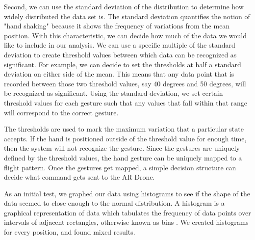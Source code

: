 \documentclass[letterpaper,english, 12pt]{article}
\begin{document}
Second, we can use the standard deviation of the distribution to determine how widely distributed the data set is. The standard deviation quantifies the notion of "hand shaking" because it shows the frequency of variations from the mean position. With this characteristic, we can decide how much of the data we would like to include in our analysis. We can use a specific multiple of the standard deviation to create threshold values between which data can be recognized as significant. For example, we can decide to set the thresholds at half a standard deviation on either side of the mean. This means that any data point that is recorded between those two threshold values, say 40 degrees and 50 degrees, will be recognized as significant. Using the standard deviation, we set certain threshold values for each gesture such that any values that fall within that range will correspond to the correct gesture.

 The thresholds are used to mark the maximum variation that a particular state accepts. If the hand is positioned outside of the threshold value for enough time, then the system will not recognize the gesture. Since the gestures are uniquely defined by the threshold values, the hand gesture can be uniquely mapped to a flight pattern. Once the gestures get mapped, a simple decision structure can decide what command gets sent to the AR Drone.

As an initial test, we graphed our data using histograms to see if the shape of the data seemed to close enough to the normal distribution. A histogram is a graphical representation of data which tabulates the frequency of data points over intervals of adjacent rectangles, otherwise known as bins \cite{cit5}. We created histograms for every position, and found mixed results. 
\end{document}
